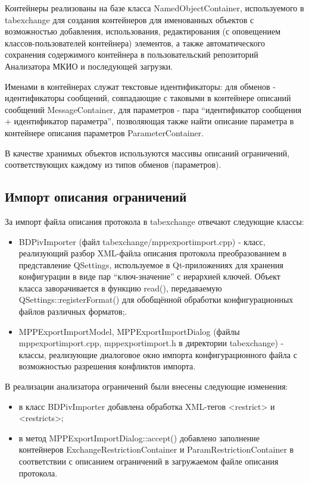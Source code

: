 Контейнеры реализованы на базе класса NamedObjectContainer, используемого в 
tabexchange для создания контейнеров для именованных объектов с возможностью 
добавления, использования, редактирования (с оповещением классов-пользователей 
контейнера) элементов, а также автоматического сохранения содержимого 
контейнера в пользовательский репозиторий Анализатора МКИО и последующей 
загрузки.

Именами в контейнерах служат текстовые идентификаторы: для обменов - 
идентификаторы сообщений, совпадающие с таковыми в контейнере описаний 
сообщений MessageContainer, для параметров - пара ``идентификатор сообщения + 
идентификатор параметра'', позволяющая также найти описание параметра в 
контейнере описания параметров ParameterContainer.

В качестве хранимых объектов используются массивы описаний ограничений, 
соответствующих каждому из типов обменов (параметров).

\subsection{Импорт описания ограничений}

За импорт файла описания протокола в tabexchange отвечают следующие классы:

\begin{itemize}
 \item BDPivImporter (файл tabexchange/mppexportimport.cpp) - класс, 
реализующий разбор XML-файла описания протокола преобразованием в представление 
QSettings, используемое в Qt-приложениях для хранения конфигурации в виде пар 
``ключ-значение'' с иерархией ключей. Объект класса заворачивается в функцию 
read(), передаваемую QSettings::registerFormat() для обобщённой обработки 
конфигурационных файлов различных форматов;.
 \item MPPExportImportModel, MPPExportImportDialog (файлы 
mppexportimport.cpp, mppexportimport.h в директории tabexchange) - классы, 
реализующие диалоговое окно импорта конфигурационного файла с возможностью 
разрешения конфликтов импорта.
\end{itemize}

В реализации анализатора ограничений были внесены следующие изменения:

\begin{itemize}
\item в класс BDPivImporter добавлена обработка XML-тегов <restrict> и 
<restricts>;
\item в метод MPPExportImportDialog::accept() добавлено заполнение контейнеров 
ExchangeRestrictionContainer и ParamRestrictionContainer в соответствии с 
описанием ограничений в загружаемом файле описания протокола.
\end{itemize}

